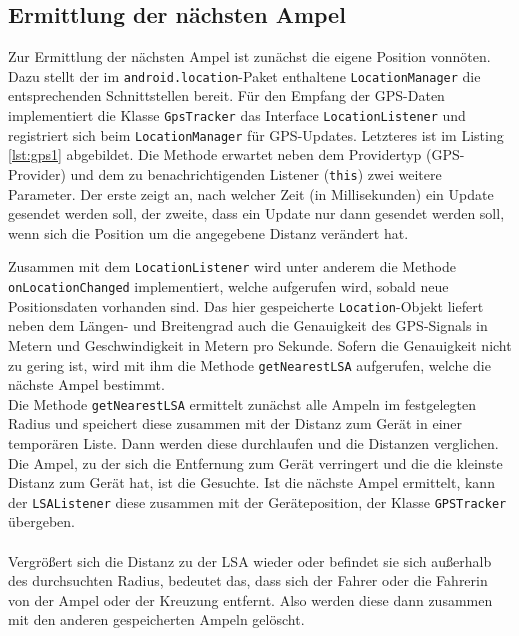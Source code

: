 \subsection{Ermittlung der nächsten Ampel}
Zur Ermittlung der nächsten Ampel ist zunächst die eigene Position vonnöten. Dazu stellt der im \texttt{android.location}-Paket enthaltene \texttt{LocationManager} die entsprechenden Schnittstellen bereit. Für den Empfang der \gls{GPS}-Daten implementiert die Klasse \texttt{GpsTracker} das Interface \texttt{LocationListener} und registriert sich beim \texttt{LocationManager} für \gls{GPS}-Updates.
Letzteres ist im Listing \ref{lst:gps1} abgebildet. Die Methode erwartet neben dem Providertyp (\gls{GPS}-Provider) und dem zu benachrichtigenden Listener (\texttt{this}) zwei weitere Parameter. Der erste zeigt an, nach welcher Zeit (in Millisekunden) ein Update gesendet werden soll, der zweite, dass ein Update nur dann gesendet werden soll, wenn sich die Position um die angegebene Distanz verändert hat.
\begin{center}
\grayRule

\grayRule
\end{center}
Zusammen mit dem \texttt{LocationListener} wird unter anderem die Methode \texttt{onLocationChanged} implementiert, welche aufgerufen wird, sobald neue Positionsdaten vorhanden sind. Das hier gespeicherte \texttt{Location}-Objekt liefert neben dem Längen- und Breitengrad auch die Genauigkeit des \gls{GPS}-Signals in Metern und Geschwindigkeit in Metern pro Sekunde. Sofern die Genauigkeit nicht zu gering ist, wird mit ihm die Methode \texttt{getNearestLSA} aufgerufen, welche die nächste Ampel bestimmt.\\
Die Methode \texttt{getNearestLSA} ermittelt zunächst alle Ampeln im festgelegten Radius und speichert diese zusammen mit der Distanz zum Gerät in einer temporären Liste. Dann werden diese durchlaufen und die Distanzen verglichen. Die Ampel, zu der sich die Entfernung zum Gerät verringert und die die kleinste Distanz zum Gerät hat, ist die Gesuchte. Ist die nächste Ampel ermittelt, kann der \texttt{LSAListener} diese zusammen mit der Geräteposition, der Klasse \texttt{GPSTracker} übergeben. \\\\
Vergrößert sich die Distanz zu der \gls{LSA} wieder oder befindet sie sich außerhalb des durchsuchten Radius, bedeutet das, dass sich der Fahrer oder die Fahrerin von der Ampel oder der Kreuzung entfernt. Also werden diese dann zusammen mit den anderen gespeicherten Ampeln gelöscht.\\ 
\begin{center}
\grayRule

\grayRule
\end{center}
%
%
